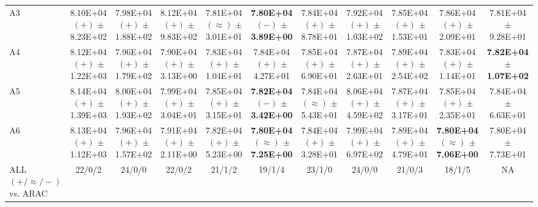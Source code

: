\begin{table}[t]
{\begin{tabular}{l*{10}{c}}
A3 & 8.10E+04 $(+)$ $\pm$ 8.23E+02 & 7.98E+04 $(+)$ $\pm$ 1.88E+02 & 8.12E+04 $(+)$ $\pm$ 9.83E+02 & 7.81E+04 $(\approx)$ $\pm$ 3.01E+01 & \textbf{7.80E+04 $(-)$ $\pm$ 3.89E+00} & 7.84E+04 $(+)$ $\pm$ 8.78E+01 & 7.92E+04 $(+)$ $\pm$ 1.03E+02 & 7.85E+04 $(+)$ $\pm$ 1.53E+01 & 7.86E+04 $(+)$ $\pm$ 2.09E+01 & 7.81E+04 $\pm$ 9.28E+01 \\
A4 & 8.12E+04 $(+)$ $\pm$ 1.22E+03 & 7.96E+04 $(+)$ $\pm$ 1.79E+02 & 7.90E+04 $(+)$ $\pm$ 3.13E+00 & 7.83E+04 $(+)$ $\pm$ 1.04E+01 & 7.84E+04 $(+)$ $\pm$ 4.27E+01 & 7.85E+04 $(+)$ $\pm$ 6.90E+01 & 7.87E+04 $(+)$ $\pm$ 2.63E+01 & 7.89E+04 $(+)$ $\pm$ 2.54E+02 & 7.83E+04 $(+)$ $\pm$ 1.14E+01 & \textbf{7.82E+04 $\pm$ 1.07E+02} \\
A5 & 8.14E+04 $(+)$ $\pm$ 1.39E+03 & 8.00E+04 $(+)$ $\pm$ 1.93E+02 & 7.99E+04 $(+)$ $\pm$ 3.04E+01 & 7.85E+04 $(+)$ $\pm$ 3.15E+01 & \textbf{7.82E+04 $(-)$ $\pm$ 3.42E+00} & 7.84E+04 $(\approx)$ $\pm$ 5.43E+01 & 8.06E+04 $(+)$ $\pm$ 4.59E+02 & 7.87E+04 $(+)$ $\pm$ 3.17E+01 & 7.85E+04 $(+)$ $\pm$ 2.35E+01 & 7.84E+04 $\pm$ 6.63E+01 \\
A6 & 8.13E+04 $(+)$ $\pm$ 1.12E+03 & 7.96E+04 $(+)$ $\pm$ 1.57E+02 & 7.91E+04 $(+)$ $\pm$ 2.11E+00 & 7.82E+04 $(+)$ $\pm$ 5.23E+00 & \textbf{7.80E+04 $(\approx)$ $\pm$ 7.25E+00} & 7.84E+04 $(+)$ $\pm$ 3.28E+01 & 7.99E+04 $(+)$ $\pm$ 6.97E+02 & 7.89E+04 $(+)$ $\pm$ 4.79E+01 & \textbf{7.80E+04 $(\approx)$ $\pm$ 7.06E+00} & 7.80E+04 $\pm$ 7.73E+01 \\
\midrule
ALL $(+/\approx/-)$ vs. ARAC & 22/0/2 & 24/0/0 & 22/0/2 & 21/1/2 & 19/1/4 & 23/1/0 & 24/0/0 & 21/0/3 & 18/1/5 & NA \\
\bottomrule
\end{tabular}%
}
\end{table}
